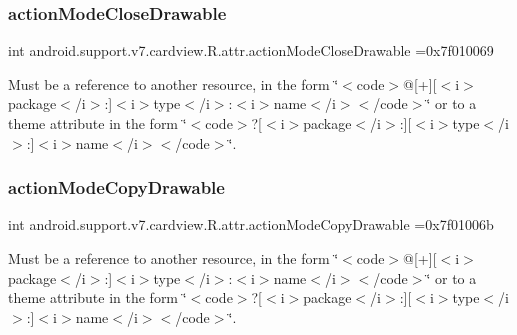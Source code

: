 \subsubsection{\texorpdfstring{action\+Mode\+Close\+Drawable}{actionModeCloseDrawable}}
{\footnotesize\ttfamily int android.\+support.\+v7.\+cardview.\+R.\+attr.\+action\+Mode\+Close\+Drawable =0x7f010069\hspace{0.3cm}{\ttfamily [static]}}

Must be a reference to another resource, in the form \char`\"{}$<$code$>$@\mbox{[}+\mbox{]}\mbox{[}$<$i$>$package$<$/i$>$\+:\mbox{]}$<$i$>$type$<$/i$>$\+:$<$i$>$name$<$/i$>$$<$/code$>$\char`\"{} or to a theme attribute in the form \char`\"{}$<$code$>$?\mbox{[}$<$i$>$package$<$/i$>$\+:\mbox{]}\mbox{[}$<$i$>$type$<$/i$>$\+:\mbox{]}$<$i$>$name$<$/i$>$$<$/code$>$\char`\"{}. \mbox{\label{classandroid_1_1support_1_1v7_1_1cardview_1_1R_1_1attr_aa61ebc172827a1041ec930a83575be69}} 
\subsubsection{\texorpdfstring{action\+Mode\+Copy\+Drawable}{actionModeCopyDrawable}}
{\footnotesize\ttfamily int android.\+support.\+v7.\+cardview.\+R.\+attr.\+action\+Mode\+Copy\+Drawable =0x7f01006b\hspace{0.3cm}{\ttfamily [static]}}

Must be a reference to another resource, in the form \char`\"{}$<$code$>$@\mbox{[}+\mbox{]}\mbox{[}$<$i$>$package$<$/i$>$\+:\mbox{]}$<$i$>$type$<$/i$>$\+:$<$i$>$name$<$/i$>$$<$/code$>$\char`\"{} or to a theme attribute in the form \char`\"{}$<$code$>$?\mbox{[}$<$i$>$package$<$/i$>$\+:\mbox{]}\mbox{[}$<$i$>$type$<$/i$>$\+:\mbox{]}$<$i$>$name$<$/i$>$$<$/code$>$\char`\"{}. \mbox{\label{classandroid_1_1support_1_1v7_1_1cardview_1_1R_1_1attr_a2fd9053aef5eba94d653e8a130f74f67}} 

